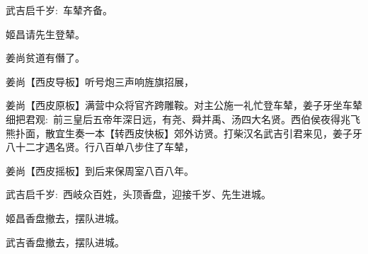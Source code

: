 {\vspace{5pt}

\textrm{武吉\hspace{30pt}启千岁:~车辇齐备。}

\textrm{姬昌\hspace{30pt}请先生登辇。}

\textrm{姜尚\hspace{30pt}贫道有僭了。}

\textrm{姜尚\hspace{30pt}【{\akai 西皮导板}】听号炮三声响旌旗招展，}

\setlength{\hangindent}{52pt}   %
{\textrm{姜尚\hspace{30pt}【{\akai 西皮原板}】满营中众将官齐跨雕鞍。对主公施一礼忙登车辇，姜子牙坐车辇细把君观:~前三皇后五帝年深日远，有尧、舜并禹、汤四大名贤。西伯侯夜得兆飞熊扑面，散宜生奏一本【{\footnotesize 转}{\akai 西皮快板}】郊外访贤。打柴汉名武吉引君来见，姜子牙八十二才遇名贤。行八百单八步住了车辇，}}

\textrm{姜尚\hspace{30pt}【{\akai 西皮摇板}】到后来保周室八百八年。}

\textrm{武吉\hspace{30pt}启千岁:~西岐众百姓，头顶香盘，迎接千岁、先生进城。}

\textrm{姬昌\hspace{30pt}香盘撤去，摆队进城。}

\textrm{武吉\hspace{30pt}香盘撤去，摆队进城。}
}

